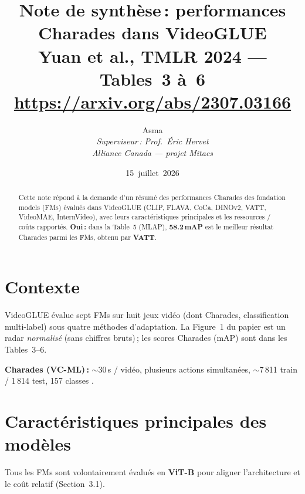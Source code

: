 \documentclass[11pt,a4paper]{article}
\title{%
  \textbf{Note de synth\`ese\,: performances Charades dans VideoGLUE}\\[0.4em]
  \large Yuan et al., TMLR 2024 --- Tables~3 \`a~6\\[0.25em]
  \normalsize\url{https://arxiv.org/abs/2307.03166}
}
\author{Asma\\
  \textit{Superviseur\,: Prof.\ \'Eric Hervet}\\
  \textit{Alliance Canada --- projet Mitacs}}
\date{15~juillet~2026}
\begin{document}
\maketitle

\begin{abstract}
\noindent
Cette note r\'epond \`a la demande d'un r\'esum\'e des performances Charades
des fondation models (FMs) \'evalu\'es dans VideoGLUE (CLIP, FLAVA, CoCa,
DINOv2, VATT, VideoMAE, InternVideo), avec leurs caract\'eristiques
principales et les ressources / co\^{u}ts rapport\'es. \textbf{Oui\,:}
dans la Table~5 (MLAP), \textbf{58.2\,mAP} est le meilleur r\'esultat
Charades parmi les FMs, obtenu par \textbf{VATT}.
\end{abstract}

\section{Contexte}

VideoGLUE \cite{yuan2024videoglue} \'evalue sept FMs sur huit jeux vid\'eo
(dont Charades, classification multi-label) sous quatre m\'ethodes
d'adaptation. La Figure~1 du papier est un radar \emph{normalis\'e} (sans
chiffres bruts)\,; les scores Charades (mAP) sont dans les Tables~3--6.

\textbf{Charades (VC-ML)\,:} $\sim$30\,s / vid\'eo, plusieurs actions
simultan\'ees, $\sim$7\,811 train / 1\,814 test, 157 classes
\cite{sigurdsson2016charades}.

\section{Caract\'eristiques principales des mod\`eles}

Tous les FMs sont volontairement \'evalu\'es en \textbf{ViT-B}
\cite{dosovitskiy2021vit} pour aligner l'architecture et le co\^{u}t relatif
(Section~3.1).
\end{document}
